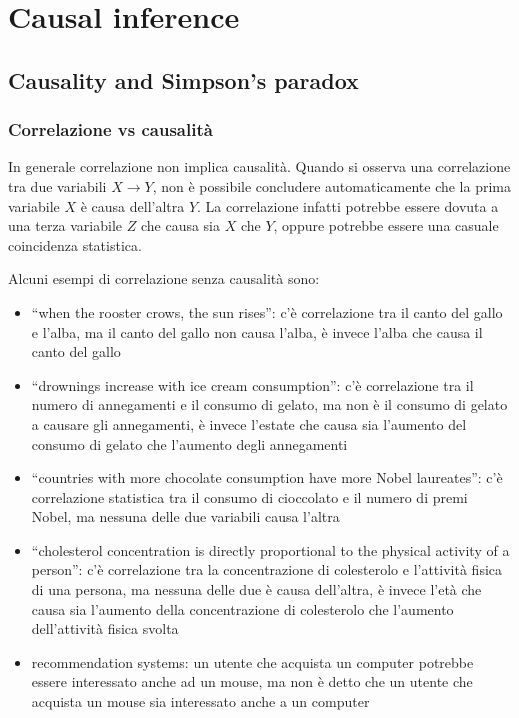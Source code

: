 \section{Causal inference}
\subsection{Causality and Simpson's paradox}
\subsubsection*{Correlazione vs causalità}
In generale correlazione non implica causalità. Quando si osserva una correlazione tra due variabili \(X \to Y\), non è possibile
concludere automaticamente che la prima variabile \(X\) è causa dell'altra \(Y\). La correlazione infatti potrebbe essere dovuta
a una terza variabile \(Z\) che causa sia \(X\) che \(Y\), oppure potrebbe essere una casuale coincidenza statistica.

Alcuni esempi di correlazione senza causalità sono:
\begin{itemize}
	\item ``when the rooster crows, the sun rises'': c'è correlazione tra il canto del gallo e l'alba, ma il canto del gallo
	non causa l'alba, è invece l'alba che causa il canto del gallo
	\item ``drownings increase with ice cream consumption'': c'è correlazione tra il numero di annegamenti e il consumo di gelato,
	ma non è il consumo di gelato a causare gli annegamenti, è invece l'estate che causa sia l'aumento del consumo di gelato che
	l'aumento degli annegamenti
	\item ``countries with more chocolate consumption have more Nobel laureates'': c'è correlazione statistica tra il consumo di
	cioccolato e il numero di premi Nobel, ma nessuna delle due variabili causa l'altra
	\item ``cholesterol concentration is directly proportional to the physical activity of a person'': c'è correlazione tra la
	concentrazione di colesterolo e l'attività fisica di una persona, ma nessuna delle due è causa dell'altra, è invece l'età che
	causa sia l'aumento della concentrazione di colesterolo che l'aumento dell'attività fisica svolta
	\item recommendation systems: un utente che acquista un computer potrebbe essere interessato anche ad un mouse, ma non è
	detto che un utente che acquista un mouse sia interessato anche a un computer
\end{itemize}

